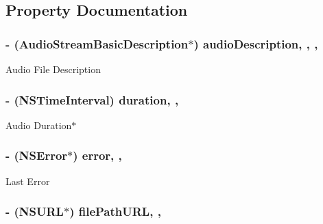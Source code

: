 \subsection{Property Documentation}
\hypertarget{interface_s_e_audio_stream_a96f11351b56bdd1d363ad05fb80d1a73}{
\subsubsection[{audio\-Description}]{\setlength{\rightskip}{0pt plus 5cm}-\/ (Audio\-Stream\-Basic\-Description$\ast$) audio\-Description\hspace{0.3cm}{\ttfamily [read]}, {\ttfamily [write]}, {\ttfamily [nonatomic]}, {\ttfamily [assign]}}}\label{interface_s_e_audio_stream_a96f11351b56bdd1d363ad05fb80d1a73}
Audio File Description \hypertarget{interface_s_e_audio_stream_af5e4493693cf24fa25af34487993d693}{
\subsubsection[{duration}]{\setlength{\rightskip}{0pt plus 5cm}-\/ (N\-S\-Time\-Interval) duration\hspace{0.3cm}{\ttfamily [read]}, {\ttfamily [nonatomic]}, {\ttfamily [assign]}}}\label{interface_s_e_audio_stream_af5e4493693cf24fa25af34487993d693}
Audio Duration$\ast$ \hypertarget{interface_s_e_audio_stream_a095232a32323fc1b43568e1609cc934d}{
\subsubsection[{error}]{\setlength{\rightskip}{0pt plus 5cm}-\/ (N\-S\-Error$\ast$) error\hspace{0.3cm}{\ttfamily [read]}, {\ttfamily [nonatomic]}, {\ttfamily [assign]}}}\label{interface_s_e_audio_stream_a095232a32323fc1b43568e1609cc934d}
Last Error \hypertarget{interface_s_e_audio_stream_a7561aaa75262c747a4da3d701e2094b9}{
\subsubsection[{file\-Path\-U\-R\-L}]{\setlength{\rightskip}{0pt plus 5cm}-\/ (N\-S\-U\-R\-L$\ast$) file\-Path\-U\-R\-L\hspace{0.3cm}{\ttfamily [read]}, {\ttfamily [nonatomic]}, {\ttfamily [assign]}}}\label{interface_s_e_audio_stream_a7561aaa75262c747a4da3d701e2094b9}
